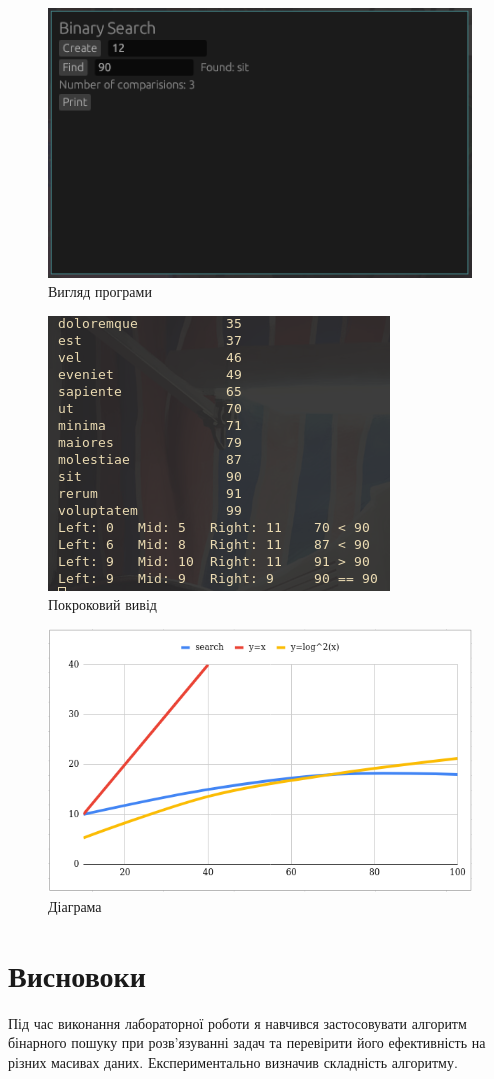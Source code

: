 \documentclass{article}
\begin{document}
\begin{normalsize}
		\begin{figure}[H]
			\centering
			\includegraphics[scale=0.7]{1}
			\caption{Вигляд програми}
		\end{figure}
		
		\begin{figure}[H]
			\centering
			\includegraphics[scale=0.7]{2}
			\caption{Покроковий вивід}
		\end{figure}
	
	\begin{figure}[H]
		\centering
		\includegraphics[scale=0.7]{3}
		\caption{Діаграма}
	\end{figure}
		
		\section*{Висновоки}
		Під час виконання лабораторної роботи я навчився застосовувати алгоритм бінарного пошуку при розв’язуванні задач та перевірити його ефективність на різних масивах даних. Експериментально визначив складність алгоритму. 
		
	\end{normalsize}
\end{document}
